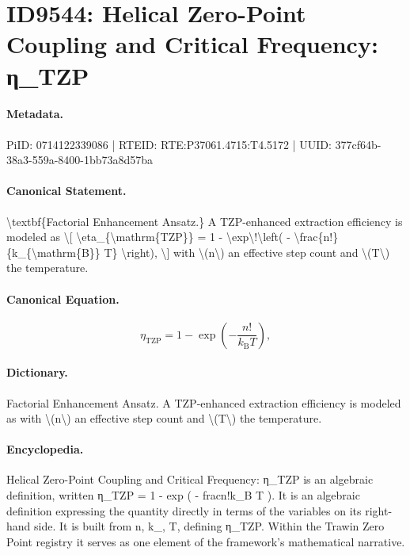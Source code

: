 \section*{ID9544: Helical Zero-Point Coupling and Critical Frequency: η\_TZP}
\paragraph{Metadata.}
PiID: 0714122339086 | RTEID: RTE:P37061.4715:T4.5172 | UUID: 377cf64b-38a3-559a-8400-1bb73a8d57ba

\paragraph{Canonical Statement.}
\textbackslash{}textbf\{Factorial Enhancement Ansatz.\} A TZP-enhanced extraction efficiency is modeled as \textbackslash{}[ \textbackslash{}eta\_\{\textbackslash{}mathrm\{TZP\}\} = 1 - \textbackslash{}exp\textbackslash{}!\textbackslash{}left( - \textbackslash{}frac\{n!\}\{k\_\{\textbackslash{}mathrm\{B\}\} T\} \textbackslash{}right), \textbackslash{}] with \textbackslash{}(n\textbackslash{}) an effective step count and \textbackslash{}(T\textbackslash{}) the temperature.

\paragraph{Canonical Equation.}
\[
\eta_{\mathrm{TZP}} = 1 - \exp\!\left( - \frac{n!}{k_{\mathrm{B}} T} \right),
\]

\paragraph{Dictionary.}
Factorial Enhancement Ansatz. A TZP-enhanced extraction efficiency is modeled as with \textbackslash{}(n\textbackslash{}) an effective step count and \textbackslash{}(T\textbackslash{}) the temperature.

\paragraph{Encyclopedia.}
Helical Zero-Point Coupling and Critical Frequency: η\_TZP is an algebraic definition, written η\_TZP = 1 - exp ( - fracn!k\_B T ). It is an algebraic definition expressing the quantity directly in terms of the variables on its right-hand side. It is built from n, k\_, T, defining η\_TZP. Within the Trawin Zero Point registry it serves as one element of the framework's mathematical narrative.
